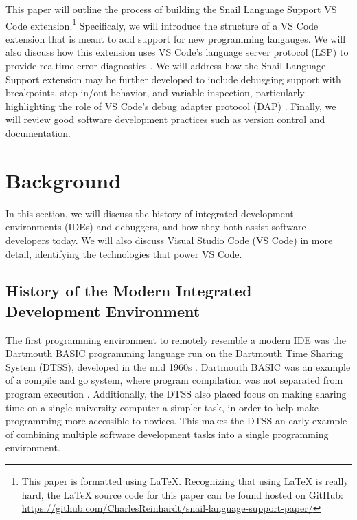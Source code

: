 \documentclass{article}
\begin{document}
This paper will outline the process of building the Snail Language Support VS Code extension.\footnote{This paper is formatted using \LaTeX. Recognizing that using \LaTeX \hspace{1pt} is really hard, the \LaTeX \hspace{1pt} source code for this paper can be found hosted on GitHub: \url{https://github.com/CharlesReinhardt/snail-language-support-paper/}} Specificaly, we will introduce the structure of a VS Code extension that is meant to add support for new programming langauges. We will also discuss how this extension uses VS Code's language server protocol (LSP) to provide realtime error diagnostics \cite{Microsoft_2022a}. We will address how the Snail Language Support extension may be further developed to include debugging support with breakpoints, step in/out behavior, and variable inspection, particularly highlighting the role of VS Code's debug adapter protocol (DAP) \cite{Microsoft_2021}. Finally, we will review good software development practices such as version control and documentation. 

\section{Background}

In this section, we will discuss the history of integrated development environments (IDEs) and debuggers, and how they both assist software developers today. We will also discuss Visual Studio Code (VS Code) in more detail, identifying the technologies that power VS Code. 

\subsection{History of the Modern Integrated Development Environment}

The first programming environment to remotely resemble a modern IDE was the Dartmouth BASIC programming language run on the Dartmouth Time Sharing System (DTSS), developed in the mid 1960s \cite{KemenyKurtz_1968, Kurtz_1978}. Dartmouth BASIC was an example of a compile and go system, where program compilation was not separated from program execution \cite{Weik_2001}. Additionally, the DTSS also placed focus on making sharing time on a single university computer a simpler task, in order to help make programming more accessible to novices. This makes the DTSS an early example of combining multiple software development tasks into a single programming environment.
\end{document}
